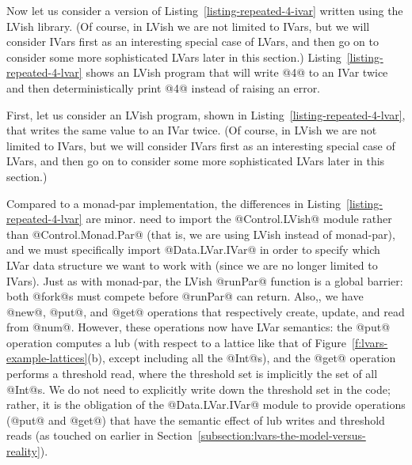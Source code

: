 \singlespacing

\doublespacing

Now let us consider a version of Listing~\ref{listing-repeated-4-ivar}
written using the LVish library. (Of course, in LVish we are not
limited to IVars, but we will consider IVars first as an interesting
special case of LVars, and then go on to consider some more
sophisticated LVars later in this section.)
Listing~\ref{listing-repeated-4-lvar} shows an LVish program that will
write @4@ to an IVar twice and then deterministically print @4@
instead of raising an error.
\fi

\ifdefined\JOURNAL
First, let us consider an LVish program, shown in
Listing~\ref{listing-repeated-4-lvar}, that writes the same value to
an IVar twice.  (Of course, in LVish we are not limited to IVars, but
we will consider IVars first as an interesting special case of LVars,
and then go on to consider some more sophisticated LVars later in this
section.)
\fi

\singlespacing

\doublespacing

\ifdefined\JOURNAL
Compared to a monad-par implementation, the differences in
Listing~\ref{listing-repeated-4-lvar} are minor.
\fi
{} need to
import the @Control.LVish@ module rather than @Control.Monad.Par@
(that is, we are using LVish instead of monad-par), and we must
specifically import @Data.LVar.IVar@ in order to specify which LVar
data structure we want to work with (since we are no longer limited to
IVars).  Just as with monad-par, the LVish @runPar@ function is a
global barrier: both @fork@s must compete before @runPar@ can return.
Also,, we have @new@, @put@, and
@get@ operations that respectively create, update, and read from
@num@.  However, these operations now have LVar semantics: the @put@
operation computes a lub (with respect to a lattice like that of
Figure~\ref{f:lvars-example-lattices}(b), except including all the
@Int@s), and the @get@ operation performs a threshold read, where the
threshold set is implicitly the set of all @Int@s.  We do not need to
explicitly write down the threshold set in the code; rather, it is the
obligation of the @Data.LVar.IVar@ module to provide operations (@put@
and @get@) that have the semantic effect of lub writes and threshold
reads (as  touched on earlier in
Section~\ref{subsection:lvars-the-model-versus-reality}).

